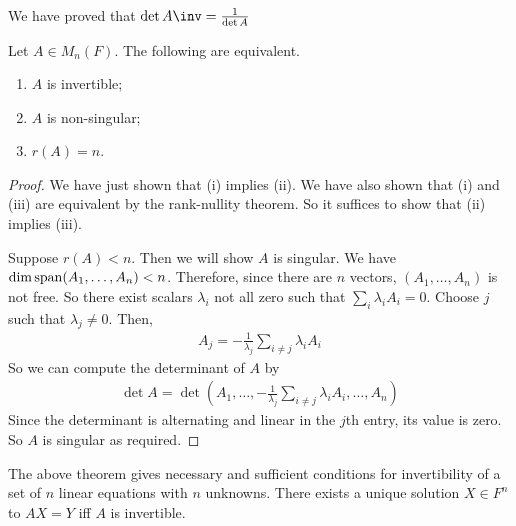 \begin{remark}
	We have proved that $\det A\inv = \frac{1}{\det A}$
\end{remark} 

\begin{theorem}
	Let $A \in M_n(F)$.
	The following are equivalent.
	\begin{enumerate}
		\item $A$ is invertible;
		\item $A$ is non-singular;
		\item $r(A) = n$.
	\end{enumerate}
\end{theorem}
\begin{proof}
	We have just shown that (i) implies (ii).
	We have also shown that (i) and (iii) are equivalent by the rank-nullity theorem.
	So it suffices to show that (ii) implies (iii).

	Suppose $r(A) < n$.
	Then we will show $A$ is singular.
	We have $\dim \operatorname{span}(A_1, \dots, A_n) < n$.
	Therefore, since there are $n$ vectors, $(A_1, \dots, A_n)$ is not free.
	So there exist scalars $\lambda_i$ not all zero such that $\sum_i \lambda_i A_i = 0$.
	Choose $j$ such that $\lambda_j \neq 0$.
	Then,
	\begin{align*}
		A_j = -\frac{1}{\lambda_j} \sum_{i \neq j} \lambda_i A_i
	\end{align*}
	So we can compute the determinant of $A$ by
	\begin{align*}
		\det A = \det(A_1, \dots, -\frac{1}{\lambda_j} \sum_{i \neq j} \lambda_i A_i, \dots, A_n)
	\end{align*}
	Since the determinant is alternating and linear in the $j$th entry, its value is zero.
	So $A$ is singular as required.
\end{proof}
\begin{remark}
	The above theorem gives necessary and sufficient conditions for invertibility of a set of $n$ linear equations with $n$ unknowns.
	There exists a unique solution $X \in F^n$ to $AX = Y$ iff $A$ is invertible.
\end{remark}

